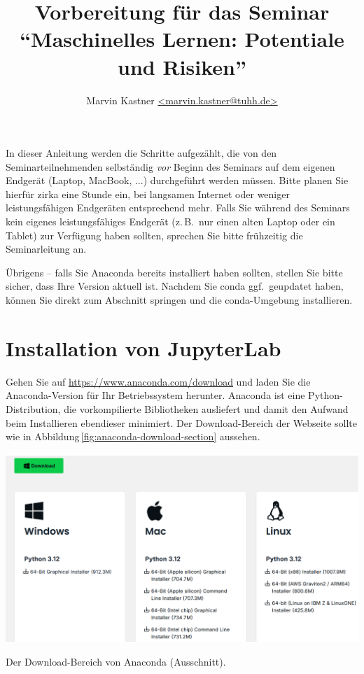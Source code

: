 \documentclass{tufte-handout}
\title{Vorbereitung für das Seminar\\
\enquote{Maschinelles Lernen: Potentiale und Risiken}}
\author{Marvin Kastner \href{mailto:marvin.kastner@tuhh.de}{<marvin.kastner@tuhh.de>}}
\begin{document}
\maketitle%

In dieser Anleitung werden die Schritte aufgezählt, die von den Seminarteilnehmenden selbständig \emph{vor} Beginn des Seminars auf dem eigenen Endgerät (Laptop, MacBook, ...) durchgeführt werden müssen.
Bitte planen Sie hierfür zirka eine Stunde ein, bei langsamen Internet oder weniger leistungsfähigen Endgeräten entsprechend mehr.
Falls Sie während des Seminars kein eigenes leistungsfähiges Endgerät (z.\,B.\ nur einen alten Laptop oder ein Tablet) zur Verfügung haben sollten, sprechen Sie bitte frühzeitig die Seminarleitung an.

Übrigens -- falls Sie Anaconda bereits installiert haben sollten, stellen Sie bitte sicher, dass Ihre Version aktuell ist.
Nachdem Sie conda ggf.\ geupdatet haben, können Sie direkt zum Abschnitt \emph{} springen und die conda-Umgebung installieren.


\section{Installation von JupyterLab}

Gehen Sie auf
\url{https://www.anaconda.com/download} 
und laden Sie die Anaconda-Version für Ihr Betriebssystem herunter.
Anaconda ist eine Python-Distribution, die vorkompilierte Bibliotheken ausliefert und damit den Aufwand beim Installieren ebendieser minimiert.
Der Download-Bereich der Webseite sollte wie in Abbildung\,\ref{fig:anaconda-download-section} aussehen.

\begin{marginfigure}
  \includegraphics{anaconda_download_section}
  \caption{Der Download-Bereich von Anaconda (Ausschnitt).}%
\label{fig:anaconda-download-section}
\end{marginfigure}
\end{document}
